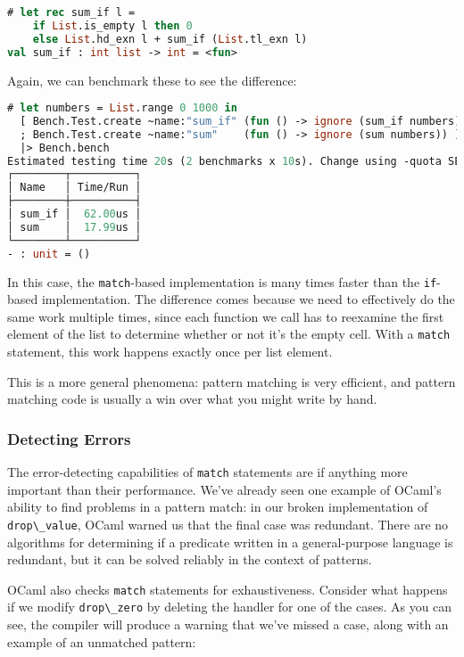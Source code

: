 \begin{lstlisting}[language=Caml]
# let rec sum_if l =
    if List.is_empty l then 0
    else List.hd_exn l + sum_if (List.tl_exn l)
val sum_if : int list -> int = <fun>
\end{lstlisting}

Again, we can benchmark these to see the difference:

\begin{lstlisting}[language=Caml]
# let numbers = List.range 0 1000 in
  [ Bench.Test.create ~name:"sum_if" (fun () -> ignore (sum_if numbers))
  ; Bench.Test.create ~name:"sum"    (fun () -> ignore (sum numbers)) ]
  |> Bench.bench
Estimated testing time 20s (2 benchmarks x 10s). Change using -quota SECS.
┌────────┬──────────┐
│ Name   │ Time/Run │
├────────┼──────────┤
│ sum_if │  62.00us │
│ sum    │  17.99us │
└────────┴──────────┘
- : unit = ()
\end{lstlisting}

In this case, the \passthrough{\lstinline!match!}-based implementation
is many times faster than the \passthrough{\lstinline!if!}-based
implementation. The difference comes because we need to effectively do
the same work multiple times, since each function we call has to
reexamine the first element of the list to determine whether or not it's
the empty cell. With a \passthrough{\lstinline!match!} statement, this
work happens exactly once per list element.

This is a more general phenomena: pattern matching is very efficient,
and pattern matching code is usually a win over what you might write by
hand.

\hypertarget{detecting-errors}{%
\subsubsection{Detecting Errors}\label{detecting-errors}}

The error-detecting capabilities of \passthrough{\lstinline!match!}
statements are if anything more important than their performance. We've
already seen one example of OCaml's ability to find problems in a
pattern match: in our broken implementation of
\passthrough{\lstinline!drop\_value!}, OCaml warned us that the final
case was redundant. There are no algorithms for determining if a
predicate written in a general-purpose language is redundant, but it can
be solved reliably in the context of
patterns.

OCaml also checks \passthrough{\lstinline!match!} statements for
exhaustiveness. Consider what happens if we modify
\passthrough{\lstinline!drop\_zero!} by deleting the handler for one of
the cases. As you can see, the compiler will produce a warning that
we've missed a case, along with an example of an unmatched pattern:

